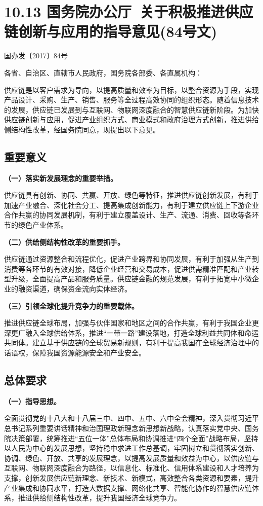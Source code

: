 \chapter{10.13 国务院办公厅~关于积极推进供应链创新与应用的指导意见(84号文)} %

\begin{center}
国办发〔2017〕84号
\end{center}


\noindent 各省、自治区、直辖市人民政府，国务院各部委、各直属机构：

供应链是以客户需求为导向，以提高质量和效率为目标，以整合资源为手段，实现产品设计、采购、生产、销售、服务等全过程高效协同的组织形态。随着信息技术的发展，供应链已发展到与互联网、物联网深度融合的智慧供应链新阶段。为加快供应链创新与应用，促进产业组织方式、商业模式和政府治理方式创新，推进供给侧结构性改革，经国务院同意，现提出以下意见。

\section{重要意义}

{ \bf （一）落实新发展理念的重要举措。 }

供应链具有创新、协同、共赢、开放、绿色等特征，推进供应链创新发展，有利于加速产业融合、深化社会分工、提高集成创新能力，有利于建立供应链上下游企业合作共赢的协同发展机制，有利于建立覆盖设计、生产、流通、消费、回收等各环节的绿色产业体系。

{ \bf （二）供给侧结构性改革的重要抓手。 }

供应链通过资源整合和流程优化，促进产业跨界和协同发展，有利于加强从生产到消费等各环节的有效对接，降低企业经营和交易成本，促进供需精准匹配和产业转型升级，全面提高产品和服务质量。供应链金融的规范发展，有利于拓宽中小微企业的融资渠道，确保资金流向实体经济。

{ \bf （三）引领全球化提升竞争力的重要载体。 }

推进供应链全球布局，加强与伙伴国家和地区之间的合作共赢，有利于我国企业更深更广融入全球供给体系，推进“一带一路”建设落地，打造全球利益共同体和命运共同体。建立基于供应链的全球贸易新规则，有利于提高我国在全球经济治理中的话语权，保障我国资源能源安全和产业安全。

\section{总体要求}

{ \bf （一）指导思想。 }

全面贯彻党的十八大和十八届三中、四中、五中、六中全会精神，深入贯彻习近平总书记系列重要讲话精神和治国理政新理念新思想新战略，认真落实党中央、国务院决策部署，统筹推进“五位一体”总体布局和协调推进“四个全面”战略布局，坚持以人民为中心的发展思想，坚持稳中求进工作总基调，牢固树立和贯彻落实创新、协调、绿色、开放、共享的发展理念，以提高发展质量和效益为中心，以供应链与互联网、物联网深度融合为路径，以信息化、标准化、信用体系建设和人才培养为支撑，创新发展供应链新理念、新技术、新模式，高效整合各类资源和要素，提升产业集成和协同水平，打造大数据支撑、网络化共享、智能化协作的智慧供应链体系，推进供给侧结构性改革，提升我国经济全球竞争力。

